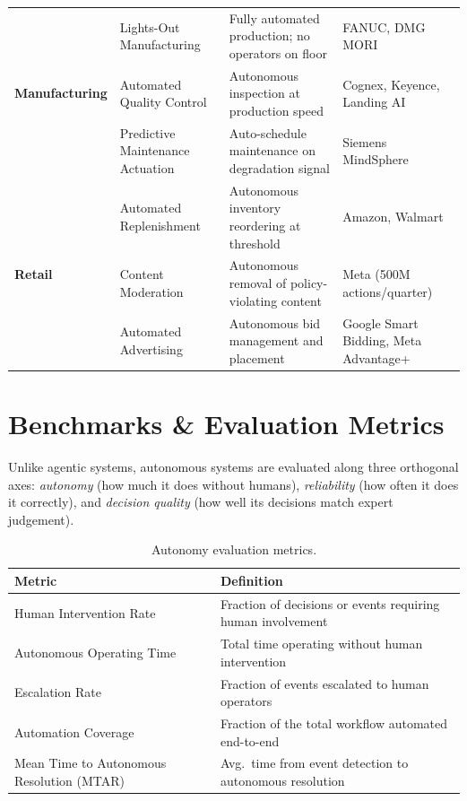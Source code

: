 \documentclass[12pt, a4paper]{article}
\begin{document}
\begin{table}[ht]
\begin{tabular}{llp{5cm}p{4cm}}
\midrule
\multirow{3}{*}{\textbf{Manufacturing}}
  & Lights-Out Manufacturing   & Fully automated production; no operators on floor     & FANUC, DMG MORI \\
  & Automated Quality Control  & Autonomous inspection at production speed             & Cognex, Keyence, Landing AI \\
  & Predictive Maintenance Actuation & Auto-schedule maintenance on degradation signal  & Siemens MindSphere \\
\midrule
\multirow{3}{*}{\textbf{Retail}}
  & Automated Replenishment    & Autonomous inventory reordering at threshold          & Amazon, Walmart \\
  & Content Moderation         & Autonomous removal of policy-violating content        & Meta (500M actions/quarter) \\
  & Automated Advertising      & Autonomous bid management and placement               & Google Smart Bidding, Meta Advantage+ \\
\bottomrule
\end{tabular}
\end{table}

\section{Benchmarks \& Evaluation Metrics}\label{sec:evaluation}

Unlike agentic systems, autonomous systems are evaluated along three orthogonal axes: \emph{autonomy} (how much it does without humans), \emph{reliability} (how often it does it correctly), and \emph{decision quality} (how well its decisions match expert judgement).

\begin{table}[ht]
\centering
\caption{Autonomy evaluation metrics.}
\label{tab:metrics-autonomy}
\begin{tabular}{ll}
\toprule
\textbf{Metric} & \textbf{Definition} \\
\midrule
Human Intervention Rate & Fraction of decisions or events requiring human involvement \\
Autonomous Operating Time & Total time operating without human intervention \\
Escalation Rate & Fraction of events escalated to human operators \\
Automation Coverage & Fraction of the total workflow automated end-to-end \\
Mean Time to Autonomous Resolution (MTAR) & Avg.\ time from event detection to autonomous resolution \\
\bottomrule
\end{tabular}
\end{table}
\end{document}
